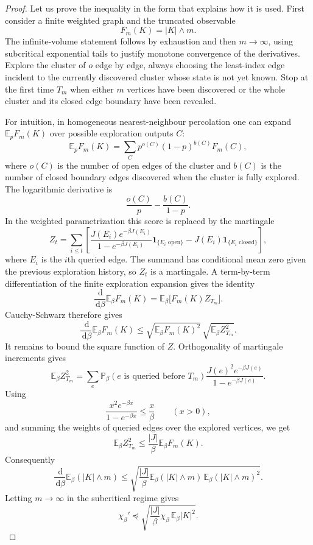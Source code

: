 \documentclass[11pt,reqno]{book}
\numberwithin{equation}{chapter}
\theoremstyle{plain}
\theoremstyle{definition}
\theoremstyle{remark}
\renewcommand{\P}{\mathbb P}
\newcommand{\E}{\mathbb E}
\newcommand{\1}{\mathbf 1}
\newcommand{\dd}{\,\mathrm d}
\newcommand{\pre}{\preceq}
\begin{document}
\begin{proof}
Let us prove the inequality in the form that explains how it is used. First
consider a finite weighted graph and the truncated observable
\[
  F_m(K)=|K|\wedge m.
\]
The infinite-volume statement follows by exhaustion and then \(m\to\infty\),
using subcritical exponential tails to justify monotone convergence of the
derivatives. Explore the cluster of \(o\) edge by edge, always choosing the
least-index edge incident to the currently discovered cluster whose state is
not yet known. Stop at the first time \(T_m\) when either \(m\) vertices have
been discovered or the whole cluster and its closed edge boundary have been
revealed.

For intuition, in homogeneous nearest-neighbour percolation one can expand
\(\E_pF_m(K)\) over possible exploration outputs \(C\):
\[
  \E_p F_m(K)
  =
  \sum_C p^{o(C)}(1-p)^{b(C)}F_m(C),
\]
where \(o(C)\) is the number of open edges of the cluster and \(b(C)\) is the
number of closed boundary edges discovered when the cluster is fully
explored. The logarithmic derivative is
\[
  \frac{o(C)}p-\frac{b(C)}{1-p}.
\]
In the weighted parametrization this score is replaced by the martingale
\[
  Z_t
  =
  \sum_{i\leq t}
  \left[
  \frac{J(E_i)e^{-\beta J(E_i)}}{1-e^{-\beta J(E_i)}}
  \1_{\{E_i\text{ open}\}}
  -
  J(E_i)\1_{\{E_i\text{ closed}\}}
  \right],
\]
where \(E_i\) is the \(i\)th queried edge. The summand has conditional mean
zero given the previous exploration history, so \(Z_t\) is a martingale. A
term-by-term differentiation of the finite exploration expansion gives the
identity
\[
  \frac{\dd}{\dd\beta}\E_\beta F_m(K)
  =
  \E_\beta\bigl[F_m(K) Z_{T_m}\bigr].
\]
Cauchy-Schwarz therefore gives
\[
  \frac{\dd}{\dd\beta}\E_\beta F_m(K)
  \leq
  \sqrt{\E_\beta F_m(K)^2}\,
  \sqrt{\E_\beta Z_{T_m}^2}.
\]
It remains to bound the square function of \(Z\). Orthogonality of martingale
increments gives
\[
  \E_\beta Z_{T_m}^2
  =
  \sum_e
  \P_\beta(e\text{ is queried before }T_m)
  \frac{J(e)^2e^{-\beta J(e)}}{1-e^{-\beta J(e)}}.
\]
Using
\[
  \frac{x^2e^{-\beta x}}{1-e^{-\beta x}}
  \leq
  \frac{x}{\beta}
  \qquad (x>0),
\]
and summing the weights of queried edges over the explored vertices, we get
\[
  \E_\beta Z_{T_m}^2
  \leq
  \frac{|J|}{\beta}\E_\beta F_m(K).
\]
Consequently
\[
  \frac{\dd}{\dd\beta}\E_\beta (|K|\wedge m)
  \leq
  \sqrt{
  \frac{|J|}{\beta}
  \E_\beta(|K|\wedge m)\,
  \E_\beta(|K|\wedge m)^2}.
\]
Letting \(m\to\infty\) in the subcritical regime gives
\[
  \chi_\beta'
  \pre
  \sqrt{\frac{|J|}{\beta}\chi_\beta\,\E_\beta |K|^2}.
\]
\end{proof}
\end{document}
